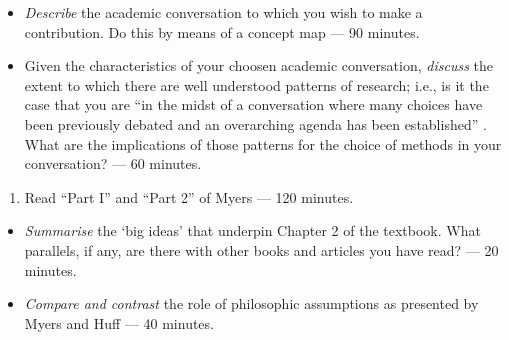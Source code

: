 \documentclass[]{book}
\providecommand{\tightlist}{%
  \setlength{\itemsep}{0pt}\setlength{\parskip}{0pt}}
\theoremstyle{definition}
\theoremstyle{definition}
\theoremstyle{definition}
\theoremstyle{remark}
\begin{document}
\begin{itemize}
\item
  \emph{Describe} the academic conversation to which you wish to make a
  contribution. Do this by means of a concept map --- 90 minutes.
\item
  Given the characteristics of your choosen academic conversation,
  \emph{discuss} the extent to which there are well understood patterns
  of research; i.e., is it the case that you are ``in the midst of a
  conversation where many choices have been previously debated and an
  overarching agenda has been established'' \autocite[
  p.~87]{huff_2009_designingresearchpublication}. What are the
  implications of those patterns for the choice of methods in your
  conversation? --- 60 minutes.
\end{itemize}

\begin{enumerate}
\def\labelenumi{\arabic{enumi}.}
\setcounter{enumi}{2}
\tightlist
\item
  Read ``Part I'' and ``Part 2'' of Myers \autocite*[
  p.~3--56]{myers_2013_qualitativeresearchbusiness} --- 120 minutes.
\end{enumerate}

\begin{itemize}
\item
  \emph{Summarise} the `big ideas' that underpin Chapter 2 of the
  textbook. What parallels, if any, are there with other books and
  articles you have read? --- 20 minutes.
\item
  \emph{Compare and contrast} the role of philosophic assumptions as
  presented by Myers \autocite*{myers_2013_qualitativeresearchbusiness}
  and Huff \autocite*{huff_2009_designingresearchpublication} --- 40
  minutes.
\end{itemize}
\end{document}

